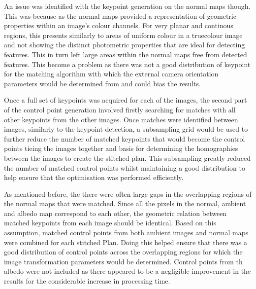 	An issue was identified with the keypoint generation on the normal maps though. This was because as the normal maps provided a representation of geometric properties within an image's colour channels. For very planar and continous regions, this presents similarly to areas of uniform colour in a truecolour image and not showing the distinct photometric properties that are ideal for detecting features. This in turn left large areas within the normal maps free from detected features. This become a problem as there was not a good distribution of keypoint for the matching algorithm with which the external camera orientation parameters would be determined from and could bias the results. 
	
	Once a full set of keypoints was acquired for each of the images, the second part of the control point generation involved firstly searching for matches with all other keypoints from the other images. Once matches were identified between images, similarly to the keypoint detection, a subsampling grid would be used to further reduce the number of matched keypoints that would become the control points tieing the images together and basis for determining the homographies between the images to create the stitched plan. This subsampling greatly reduced the number of matched control points whilst maintaining a good distribution to help ensure that the optimisation was performed efficiently. 
	
	As mentioned before, the there were often large gaps in the overlapping regions of the normal maps that were matched. Since all the pixels in the normal, ambient and albedo map correspond to each other, the geometric relation between matched keypoints from each image should be identical. Based on this assumption, matched control points from both ambient images and normal maps were combined for each stitched Plan. Doing this helped ensure that there was a good distribution of control points across the overlapping regions for which the image transformation parameters would be determined. Control points from th albedo were not included as there appeared to be a negligible improvement in the results for the considerable increase in processing time.
	
